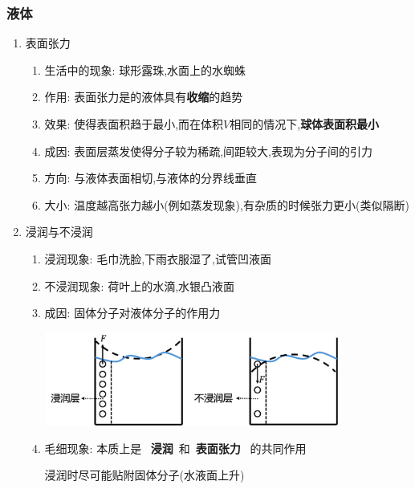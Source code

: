 \documentclass{article}
\begin{document}
\subsubsection{液体}
\begin{enumerate}
    \item 表面张力
          \begin{enumerate}[label = (\arabic*)]
              \item 生活中的现象: 球形露珠,水面上的水蜘蛛
              \item 作用: 表面张力是的液体具有\textbf{收缩}的趋势
              \item 效果: 使得表面积趋于最小,而在体积$V$相同的情况下,\textbf{球体表面积最小}
              \item 成因: 表面层蒸发使得分子较为稀疏,间距较大,表现为分子间的引力
              \item 方向: 与液体表面相切,与液体的分界线垂直
              \item 大小: 温度越高张力越小(例如蒸发现象),有杂质的时候张力更小(类似隔断)
          \end{enumerate}
    \item 浸润与不浸润
          \begin{enumerate}[label = (\arabic*)]
              \item 浸润现象: 毛巾洗脸,下雨衣服湿了,试管凹液面
              \item 不浸润现象: 荷叶上的水滴,水银凸液面
              \item 成因: 固体分子对液体分子的作用力

                    \begin{center}
                        \includegraphics[width = 0.8\textwidth]{./pictures/24.png}
                    \end{center}

              \item 毛细现象: 本质上是 \, \textbf{浸润} \,和\, \textbf{表面张力} \, 的共同作用

                    \hspace{4.7em}\begin{minipage}{0.7\textwidth}
                        浸润时尽可能贴附固体分子(水液面上升)


\end{minipage}
\end{enumerate}
\end{enumerate}
\end{document}
